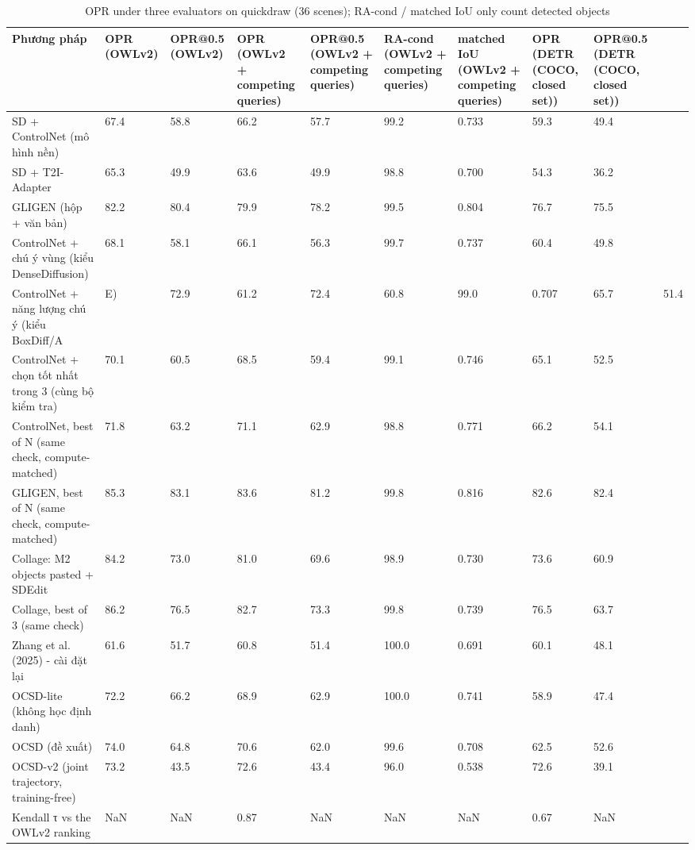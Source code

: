 \begin{table}
\caption{OPR under three evaluators on quickdraw (36 scenes); RA-cond / matched IoU only count detected objects}
\begin{tabular}{lllllllll}
\toprule
Phương pháp & OPR (OWLv2) & OPR@0.5 (OWLv2) & OPR (OWLv2 + competing queries) & OPR@0.5 (OWLv2 + competing queries) & RA-cond (OWLv2 + competing queries) & matched IoU (OWLv2 + competing queries) & OPR (DETR (COCO, closed set)) & OPR@0.5 (DETR (COCO, closed set)) \\
\midrule
SD + ControlNet (mô hình nền) & 67.4 & 58.8 & 66.2 & 57.7 & 99.2 & 0.733 & 59.3 & 49.4 \\
SD + T2I-Adapter & 65.3 & 49.9 & 63.6 & 49.9 & 98.8 & 0.700 & 54.3 & 36.2 \\
GLIGEN (hộp + văn bản) & 82.2 & 80.4 & 79.9 & 78.2 & 99.5 & 0.804 & 76.7 & 75.5 \\
ControlNet + chú ý vùng (kiểu DenseDiffusion) & 68.1 & 58.1 & 66.1 & 56.3 & 99.7 & 0.737 & 60.4 & 49.8 \\
ControlNet + năng lượng chú ý (kiểu BoxDiff/A&E) & 72.9 & 61.2 & 72.4 & 60.8 & 99.0 & 0.707 & 65.7 & 51.4 \\
ControlNet + chọn tốt nhất trong 3 (cùng bộ kiểm tra) & 70.1 & 60.5 & 68.5 & 59.4 & 99.1 & 0.746 & 65.1 & 52.5 \\
ControlNet, best of N (same check, compute-matched) & 71.8 & 63.2 & 71.1 & 62.9 & 98.8 & 0.771 & 66.2 & 54.1 \\
GLIGEN, best of N (same check, compute-matched) & 85.3 & 83.1 & 83.6 & 81.2 & 99.8 & 0.816 & 82.6 & 82.4 \\
Collage: M2 objects pasted + SDEdit & 84.2 & 73.0 & 81.0 & 69.6 & 98.9 & 0.730 & 73.6 & 60.9 \\
Collage, best of 3 (same check) & 86.2 & 76.5 & 82.7 & 73.3 & 99.8 & 0.739 & 76.5 & 63.7 \\
Zhang et al. (2025) - cài đặt lại & 61.6 & 51.7 & 60.8 & 51.4 & 100.0 & 0.691 & 60.1 & 48.1 \\
OCSD-lite (không học định danh) & 72.2 & 66.2 & 68.9 & 62.9 & 100.0 & 0.741 & 58.9 & 47.4 \\
OCSD (đề xuất) & 74.0 & 64.8 & 70.6 & 62.0 & 99.6 & 0.708 & 62.5 & 52.6 \\
OCSD-v2 (joint trajectory, training-free) & 73.2 & 43.5 & 72.6 & 43.4 & 96.0 & 0.538 & 72.6 & 39.1 \\
Kendall τ vs the OWLv2 ranking & NaN & NaN & 0.87 & NaN & NaN & NaN & 0.67 & NaN \\
\bottomrule
\end{tabular}
\end{table}
